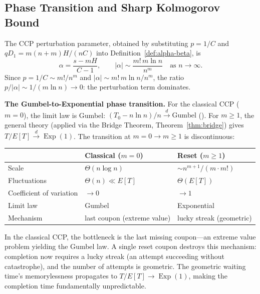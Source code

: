 \documentclass[11pt]{article}
\theoremstyle{plain}
\theoremstyle{definition}
\theoremstyle{remark}
\DeclareMathOperator{\Exp}{Exp}
\begin{document}
\subsection{Phase Transition and Sharp Kolmogorov Bound}\label{sec:ccp-sharp}

The CCP perturbation parameter, obtained by substituting $p = 1/C$ and $qD_1 = m(n+m)H/(nC)$ into Definition~\ref{def:alpha-beta}, is
\begin{equation}\label{eq:ccp-alpha}
  \alpha = \frac{s - mH}{C-1}, \qquad |\alpha| \sim \frac{m!\,m\ln n}{n^m} \quad\text{as } n \to \infty.
\end{equation}
Since $p = 1/C \sim m!/n^m$ and $|\alpha| \sim m!\,m\ln n/n^m$, the ratio $p/|\alpha| \sim 1/(m\ln n) \to 0$: the perturbation term dominates.

\medskip
\noindent\textbf{The Gumbel-to-Exponential phase transition.}\;
For the classical CCP ($m = 0$), the limit law is Gumbel: $(T_0 - n\ln n)/n \xrightarrow{d} \text{Gumbel}$ (\cite{ER61, BB65}).  For $m \geq 1$, the general theory (applied via the Bridge Theorem, Theorem~\ref{thm:bridge}) gives $T/E[T] \xrightarrow{d} \Exp(1)$.  The transition at $m = 0 \to m \geq 1$ is discontinuous:

\begin{center}
\small
\renewcommand{\arraystretch}{1.2}
\begin{tabular}{lll}
\toprule
& \textbf{Classical ($m = 0$)} & \textbf{Reset ($m \geq 1$)} \\
\midrule
Scale & $\Theta(n\log n)$ & \(\sim n^{m+1}/(m\cdot m!)\) \\
Fluctuations & $\Theta(n) \ll E[T]$ & $\Theta(E[T])$ \\
Coefficient of variation & $\to 0$ & $\to 1$ \\
Limit law & Gumbel & Exponential \\
Mechanism & last coupon (extreme value) & lucky streak (geometric) \\
\bottomrule
\end{tabular}
\end{center}

In the classical CCP, the bottleneck is the last missing coupon---an extreme value problem yielding the Gumbel law.  A single reset coupon destroys this mechanism: completion now requires a lucky streak (an attempt succeeding without catastrophe), and the number of attempts is geometric.  The geometric waiting time's memorylessness propagates to $T/E[T] \to \Exp(1)$, making the completion time fundamentally unpredictable.
\end{document}
